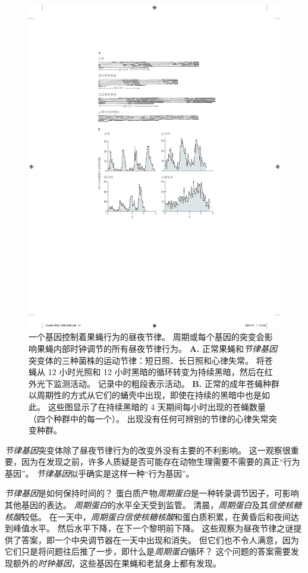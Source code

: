 \begin{figure}[htbp]
	\centering
	\includegraphics[width=0.8\linewidth]{chap02/fig_2_11}
	\caption{一个基因控制着果蝇行为的昼夜节律。
		周期或每个基因的突变会影响果蝇内部时钟调节的所有昼夜节律行为\cite{konopka1971clock}。
		\textbf{A.} 正常果蝇和\textit{节律基因}突变体的三种菌株的运动节律：短日照、长日照和心律失常。
		将苍蝇从 12 小时光照和 12 小时黑暗的循环转变为持续黑暗，然后在红外光下监测活动。
		记录中的粗段表示活动。
		\textbf{B.} 正常的成年苍蝇种群以周期性的方式从它们的蛹壳中出现，即使在持续的黑暗中也是如此。
		这些图显示了在持续黑暗的 4 天期间每小时出现的苍蝇数量（四个种群中的每一个）。
		出现没有任何可辨别的节律的心律失常突变种群。}
	\label{fig:2_11}
\end{figure}


\textit{节律基因}突变体除了昼夜节律行为的改变外没有主要的不利影响。
这一观察很重要，因为在发现之前，许多人质疑是否可能存在动物生理需要不需要的真正“行为基因”。
\textit{节律基因}似乎确实是这样一种“行为基因”。


\textit{节律基因}是如何保持时间的？
蛋白质产物\textit{周期蛋白}是一种转录调节因子，可影响其他基因的表达。
\textit{周期蛋白}的水平全天受到监管。
清晨，\textit{周期蛋白}及其\textit{信使核糖核酸}较低。
在一天中，\textit{周期蛋白}\textit{信使核糖核酸}和蛋白质积累，在黄昏后和夜间达到峰值水平。
然后水平下降，在下一个黎明前下降。
这些观察为昼夜节律之谜提供了答案，即一个中央调节器在一天中出现和消失。
但它们也不令人满意，因为它们只是将问题往后推了一步，即什么是\textit{周期蛋白}循环？
这个问题的答案需要发现额外的\textit{时钟基因}，这些基因在果蝇和老鼠身上都有发现。


